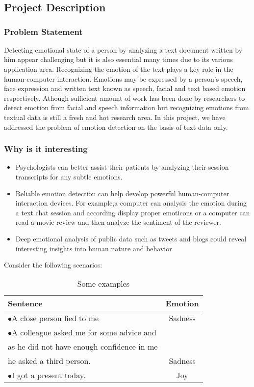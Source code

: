 \chapter{}
\section{Project Description}
\subsection{Problem Statement}
Detecting emotional state of a person by analyzing a text document
written by him appear challenging but it is also essential many times due to its various application area. Recognizing the emotion of the text plays a key role in 
the human-computer interaction. Emotions may be expressed by a person's speech, 
face  expression  and  written  text  known  as  speech,  facial  and  text  based  emotion 
respectively. Athough sufficient amount of work has been done by researchers to detect emotion from facial and 
speech information but recognizing  emotions  from  textual  data  is still a fresh and hot 
research area. In this project, we have addressed the problem of emotion detection on the basis of text data only.
\subsection{Why is it interesting}
\begin{itemize}
\item Psychologists can better assist their patients by analyzing their session transcripts for any subtle emotions.
\item Reliable emotion detection can help develop powerful human-computer interaction devices. For example,a computer can analysis the emotion during a text chat session and according display proper emoticons or a computer can read a movie review and then analyze the sentiment of the reviewer.
\item Deep  emotional  analysis  of  public  data such  as  tweets  and  blogs  could  reveal  interesting  insights into human nature and behavior
\end{itemize}

Consider the following scenarios:

\begin{table}[ht!]
\centering
\label{tab-some-examples}
\begin{tabular}{l|c}
\textbf{Sentence} & \textbf{Emotion} \\
\hline
$\bullet$A close person lied to me & Sadness \\
$\bullet$A colleague asked me for some advice and & \\
as he did not have enough confidence in me & \\
he asked a third person. & Sadness \\
$\bullet$I got a present today. & Joy
\end{tabular}
\caption{Some examples}
\end{table}


